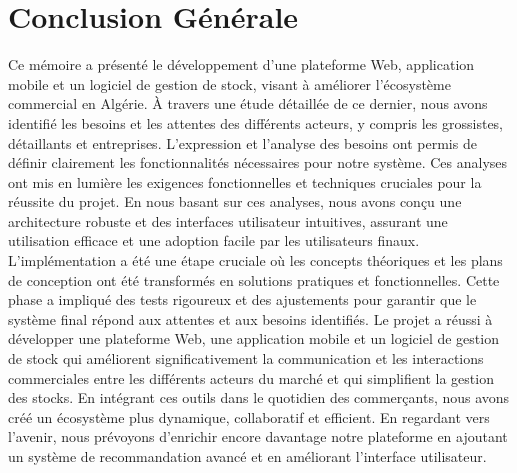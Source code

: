 \documentclass[edit,12pt,a4paper,ChapStyle,oneside,doubleinterligne]{report}
\begin{document}
\chapter*{Conclusion Générale}
Ce mémoire a présenté le développement d'une plateforme Web, application mobile et un logiciel de gestion de stock, visant à améliorer l'écosystème commercial en Algérie. À travers une étude détaillée de ce dernier, nous avons identifié les besoins et les attentes des différents acteurs, y compris les grossistes, détaillants et entreprises.
\newline\newline
L'expression et l'analyse des besoins ont permis de définir clairement les fonctionnalités nécessaires pour notre système. Ces analyses ont mis en lumière les exigences fonctionnelles et techniques cruciales pour la réussite du projet. En nous basant sur ces analyses, nous avons conçu une architecture robuste et des interfaces utilisateur intuitives, assurant une utilisation efficace et une adoption facile par les utilisateurs finaux.
\newline \newline
L'implémentation a été une étape cruciale où les concepts théoriques et les plans de conception ont été transformés en solutions pratiques et fonctionnelles. Cette phase a impliqué des tests rigoureux et des ajustements pour garantir que le système final répond aux attentes et aux besoins identifiés.
\newline \newline
Le projet a réussi à développer une plateforme Web, une application mobile et un logiciel de gestion de stock qui améliorent significativement la communication et les interactions commerciales entre les différents acteurs du marché et qui simplifient la gestion des stocks. En intégrant ces outils dans le quotidien des commerçants, nous avons créé un écosystème plus dynamique, collaboratif et efficient.
\newline \newline
En regardant vers l'avenir, nous prévoyons d'enrichir encore davantage notre plateforme en ajoutant un système de recommandation avancé et en améliorant l'interface utilisateur.
\end{document}
